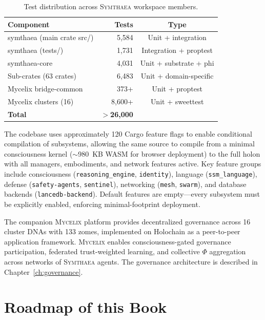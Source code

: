 \documentclass[12pt]{book}
\newcommand{\symthaea}{\textsc{Symthaea}}
\newcommand{\mycelix}{\textsc{Mycelix}}
\begin{document}
\begin{table}[H]
\centering
\caption{Test distribution across \symthaea{} workspace members.}
\label{tab:test-distribution}
\begin{tabular}{lrc}
\toprule
\textbf{Component} & \textbf{Tests} & \textbf{Type} \\
\midrule
symthaea (main crate src/) & 5,584 & Unit + integration \\
symthaea (tests/) & 1,731 & Integration + proptest \\
symthaea-core & 4,031 & Unit + substrate + phi \\
Sub-crates (63 crates) & 6,483 & Unit + domain-specific \\
Mycelix bridge-common & 373+ & Unit + proptest \\
Mycelix clusters (16) & 8,600+ & Unit + sweettest \\
\midrule
\textbf{Total} & \textbf{$>$26,000} & \\
\bottomrule
\end{tabular}
\end{table}

The codebase uses approximately 120 Cargo feature flags to enable conditional compilation of subsystems, allowing the same source to compile from a minimal consciousness kernel ($\sim$980~KB WASM for browser deployment) to the full holon with all managers, embodiments, and network features active. Key feature groups include consciousness (\texttt{reasoning\_engine}, \texttt{identity}), language (\texttt{ssm\_language}), defense (\texttt{safety-agents}, \texttt{sentinel}), networking (\texttt{mesh}, \texttt{swarm}), and database backends (\texttt{lancedb-backend}). Default features are empty---every subsystem must be explicitly enabled, enforcing minimal-footprint deployment.

The companion \mycelix{} platform provides decentralized governance across 16 cluster DNAs with 133 zomes, implemented on Holochain as a peer-to-peer application framework. \mycelix{} enables consciousness-gated governance participation, federated trust-weighted learning, and collective $\Phi$ aggregation across networks of \symthaea{} agents. The governance architecture is described in Chapter~\ref{ch:governance}.

\section{Roadmap of this Book}
\end{document}
